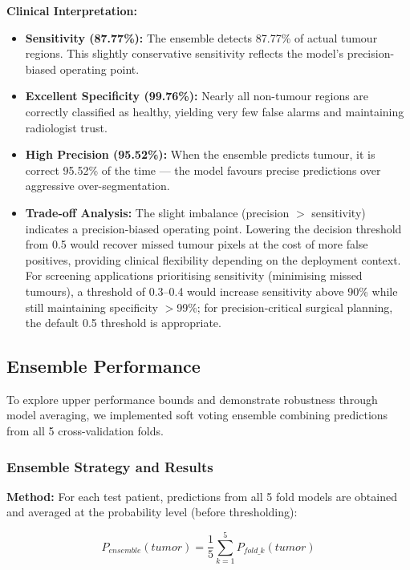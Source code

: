 \textbf{Clinical Interpretation:}
\begin{itemize}
    \item \textbf{Sensitivity (87.77\%):} The ensemble detects 87.77\% of actual tumour regions. This slightly conservative sensitivity reflects the model's precision-biased operating point.

    \item \textbf{Excellent Specificity (99.76\%):} Nearly all non-tumour regions are correctly classified as healthy, yielding very few false alarms and maintaining radiologist trust.

    \item \textbf{High Precision (95.52\%):} When the ensemble predicts tumour, it is correct 95.52\% of the time — the model favours precise predictions over aggressive over-segmentation.

    \item \textbf{Trade-off Analysis:} The slight imbalance (precision $>$ sensitivity) indicates a precision-biased operating point. Lowering the decision threshold from 0.5 would recover missed tumour pixels at the cost of more false positives, providing clinical flexibility depending on the deployment context. For screening applications prioritising sensitivity (minimising missed tumours), a threshold of 0.3--0.4 would increase sensitivity above 90\% while still maintaining specificity $>$99\%; for precision-critical surgical planning, the default 0.5 threshold is appropriate.
\end{itemize}


\subsection{Ensemble Performance}

To explore upper performance bounds and demonstrate robustness through model averaging, we implemented soft voting ensemble combining predictions from all 5 cross-validation folds.

\subsubsection{Ensemble Strategy and Results}

\textbf{Method:} For each test patient, predictions from all 5 fold models are obtained and averaged at the probability level (before thresholding):

\begin{equation}
P_{ensemble}(tumor) = \frac{1}{5} \sum_{k=1}^{5} P_{fold\_k}(tumor)
\end{equation}

